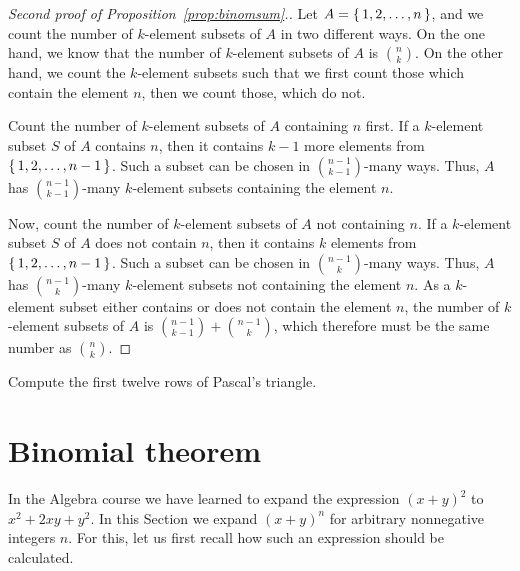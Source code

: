 \begin{proof}[Second proof of Proposition~\ref{prop:binomsum}.]
Let $A=\left\{\,1, 2, \dots , n\,\right\}$, 
and we count the number of $k$-element subsets of $A$ in two different ways. 
On the one hand, we know that the number of $k$-element subsets of $A$ is $\binom{n}{k}$. 
On the other hand, we count the $k$-element subsets such that we first count those which contain the element $n$, 
then we count those, which do not. 

Count the number of $k$-element subsets of $A$ containing $n$ first. 
If a $k$-element subset $S$ of $A$ contains $n$, then it contains $k-1$ more elements from $\left\{\,1, 2, \dots , n-1\,\right\}$. 
Such a subset can be chosen in $\binom{n-1}{k-1}$-many ways.
Thus, $A$ has $\binom{n-1}{k-1}$-many $k$-element subsets containing the element $n$. 

Now, count the number of $k$-element subsets of $A$ not containing $n$. 
If a $k$-element subset $S$ of $A$ does not contain $n$, then it contains $k$ elements from $\left\{\,1, 2, \dots , n-1\,\right\}$. 
Such a subset can be chosen in $\binom{n-1}{k}$-many ways.
Thus, $A$ has $\binom{n-1}{k}$-many $k$-element subsets not containing the element $n$. 
As a $k$-element subset either contains or does not contain the element $n$, 
the number of $k$-element subsets of $A$ is $\binom{n-1}{k-1} + \binom{n-1}{k}$, 
which therefore must be the same number as $\binom{n}{k}$. 
\end{proof}

\begin{exercise}\label{ex:pascal12}
Compute the first twelve rows of Pascal's triangle. 
\end{exercise}


\section{Binomial theorem}

In the Algebra course we have learned to expand the expression $(x+y)^2$ to $x^2 + 2xy + y^2$. 
In this Section we expand $(x+y)^n$ for arbitrary nonnegative integers $n$. 
For this, let us first recall how such an expression should be calculated. 

